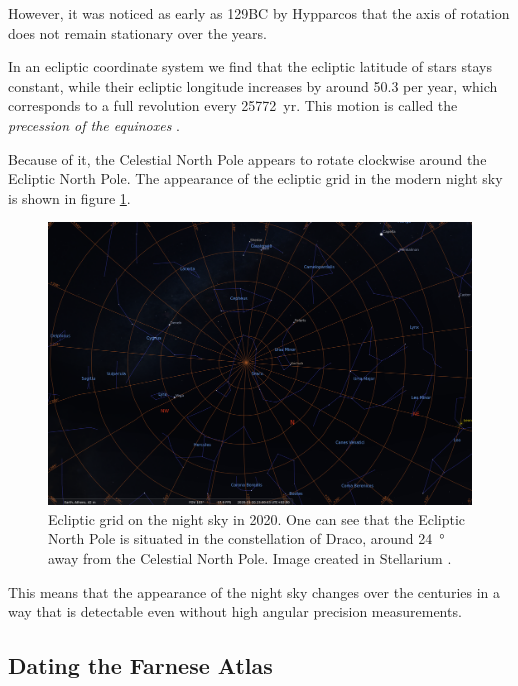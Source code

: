 \documentclass[main.tex]{subfiles}
\begin{document}
However, it was noticed as early as 129BC by Hypparcos that the axis of rotation does not remain stationary over the years. 

In an ecliptic coordinate system we find that the ecliptic latitude of stars stays constant, while their ecliptic longitude increases by around \SI{50.3}{\arcsec} per year, which corresponds to a full revolution every \SI{25772}{yr}.
This motion is called the \emph{precession of the equinoxes}
\cite[]{barbieriLezioniDiAstronomia2003}. 

Because of it, the Celestial North Pole appears to rotate clockwise around the Ecliptic North Pole. The appearance of the ecliptic grid in the modern night sky is shown in figure \ref{fig:ecliptic-grid}. 

\begin{figure}[ht]
\centering
\includegraphics[width=\textwidth]{figures/ecliptic_grid_athens_now.png}
\caption{Ecliptic grid on the night sky in 2020. One can see that the Ecliptic North Pole is situated in the constellation of Draco, around \SI{24}{\degree} away from the Celestial North Pole. Image created in Stellarium \cite[]{stellariumcontributorsStellariumAstronomySoftware2020}.}
\label{fig:ecliptic-grid}
\end{figure}

This means that the appearance of the night sky changes over the centuries in a way that is detectable even without high angular precision measurements. 

\subsection{Dating the Farnese Atlas}
\end{document}
